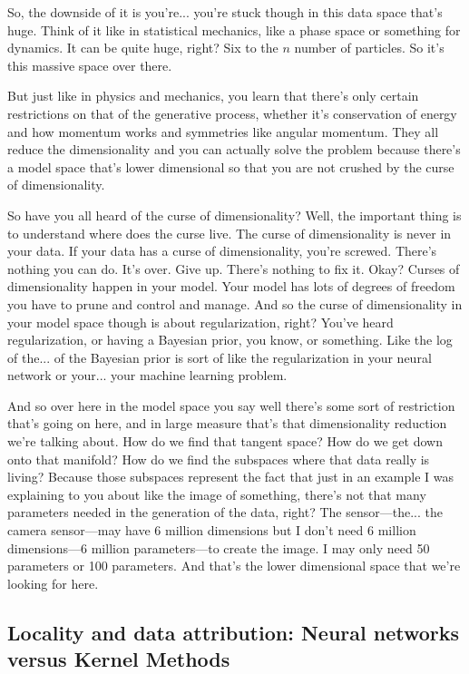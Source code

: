 So, the downside of it is you're... you're stuck though in this data space that's huge. Think of it like in statistical mechanics, like a phase space or something for dynamics. It can be quite huge, right? Six to the $n$ number of particles. So it's this massive space over there. 

But just like in physics and mechanics, you learn that there's only certain restrictions on that of the generative process, whether it's conservation of energy and how momentum works and symmetries like angular momentum. They all reduce the dimensionality and you can actually solve the problem because there's a model space that's lower dimensional so that you are not crushed by the curse of dimensionality. 

So have you all heard of the curse of dimensionality? Well, the important thing is to understand where does the curse live. The curse of dimensionality is never in your data. If your data has a curse of dimensionality, you're screwed. There's nothing you can do. It's over. Give up. There's nothing to fix it. Okay? Curses of dimensionality happen in your model. Your model has lots of degrees of freedom you have to prune and control and manage. And so the curse of dimensionality in your model space though is about regularization, right? You've heard regularization, or having a Bayesian prior, you know, or something. Like the log of the... of the Bayesian prior is sort of like the regularization in your neural network or your... your machine learning problem. 

And so over here in the model space you say well there's some sort of restriction that's going on here, and in large measure that's that dimensionality reduction we're talking about. How do we find that tangent space? How do we get down onto that manifold? How do we find the subspaces where that data really is living? Because those subspaces represent the fact that just in an example I was explaining to you about like the image of something, there's not that many parameters needed in the generation of the data, right? The sensor—the... the camera sensor—may have 6 million dimensions but I don't need 6 million dimensions—6 million parameters—to create the image. I may only need 50 parameters or 100 parameters. And that's the lower dimensional space that we're looking for here. 
\medskip \newline


\subsection{Locality and data attribution: Neural networks versus Kernel Methods}

